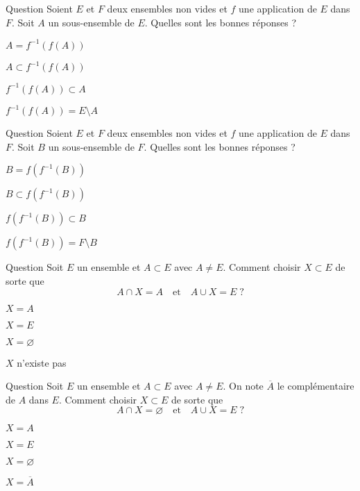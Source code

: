 \begin{multi}[multiple,feedback=
{Pour tout \(x\in A\), on a \(f(x)\in f(A)\), donc \(x\in f^{-1}(f(A))\).
}]{Question}
Soient \(E\) et \(F\) deux ensembles non vides et \(f\) une application de \(E\) dans \(F\). Soit \(A\) un sous-ensemble de \(E\). Quelles sont les bonnes réponses ?

    \item \(A=f^{-1}(f(A))\)
    \item* \(A\subset f^{-1}(f(A))\)
    \item \(f^{-1}(f(A))\subset A\)
    \item \(f^{-1}(f(A))=E\setminus A\)
\end{multi}


\begin{multi}[multiple,feedback=
{Soit \(y\in f(f^{-1}(B))\). Donc il existe \(x\in f^{-1}(B)\) tel que \(y=f(x)\). Mais, \(x\in f^{-1}(B)\Leftrightarrow f(x)\in B\). Donc \(y=f(x)\in B\).
}]{Question}
Soient \(E\) et \(F\) deux ensembles non vides et \(f\) une application de \(E\) dans \(F\). Soit \(B\) un sous-ensemble de \(F\). Quelles sont les bonnes réponses ?

    \item \(B=f(f^{-1}(B))\)
    \item \(B\subset f(f^{-1}(B))\)
    \item* \(f(f^{-1}(B))\subset B\)
    \item \(f(f^{-1}(B))=F\setminus B\)
\end{multi}


\begin{multi}[multiple,feedback=
{Par définition \(A\cap X=A\Rightarrow A\subset X\) et \(A\cup X=E\Rightarrow \overline{A}\subset X\). C'est-à-dire \(A\cup \overline{A}\subset X\).
}]{Question}
Soit \(E\) un ensemble et \(A\subset E\) avec \(A\neq E\). Comment choisir \(X\subset E\) de sorte que
\[A\cap X=A\quad \mbox{et}\quad A\cup X=E \; ?\]

    \item \(X=A\)
    \item* \(X=E\)
    \item \(X=\varnothing\)
    \item \(X\) n'existe pas
\end{multi}


\begin{multi}[multiple,feedback=
{\(\{A,X\}\) est une partition de \(E\), donc \(X=\overline{A}\).
}]{Question}
Soit \(E\) un ensemble et \(A\subset E\) avec \(A\neq E\). On note \(\overline{A}\) le complémentaire de \(A\) dans \(E\). Comment choisir \(X\subset E\) de sorte que
\[A\cap X=\varnothing \quad \mbox{et}\quad A\cup X=E \; ?\]

    \item \(X=A\)
    \item \(X=E\)
    \item \(X=\varnothing\)
    \item* \(X=\overline{A}\)
\end{multi}


